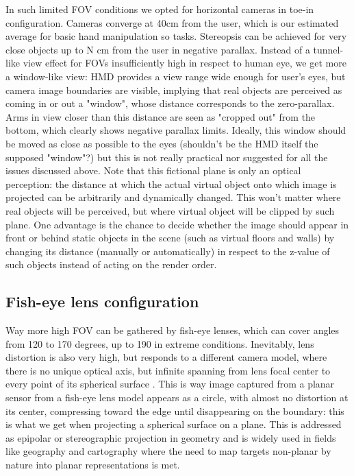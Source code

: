 In such limited FOV conditions we opted for horizontal cameras in toe-in configuration. Cameras converge at 40cm from the user, which is our estimated average for basic hand manipulation so tasks. Stereopsis can be achieved for very close objects up to N cm from the user in negative parallax. Instead of a tunnel-like view effect for FOVs insufficiently high in respect to human eye, we get more a window-like view: HMD provides a view range wide enough for user's eyes, but camera image boundaries are visible, implying that real objects are perceived as coming in or out a "window", whose distance corresponds to the zero-parallax. Arms in view closer than this distance are seen as "cropped out" from the bottom, which clearly shows negative parallax limits. Ideally, this window should be moved as close as possible to the eyes (shouldn't be the HMD itself the supposed "window"?) but this is not really practical nor suggested for all the issues discussed above. Note that this fictional plane is only an optical perception: the distance at which the actual virtual object onto which image is projected can be arbitrarily and dynamically changed. This won't matter where real objects will be perceived, but where virtual object will be clipped by such plane. One advantage is the chance to decide whether the image should appear in front or behind static objects in the scene (such as virtual floors and walls) by changing its distance (manually or automatically) in respect to the z-value of such objects instead of acting on the render order.

\subsection{Fish-eye lens configuration}
Way more high FOV can be gathered by fish-eye lenses, which can cover angles from 120 to 170 degrees, up to 190 in extreme conditions. Inevitably, lens distortion is also very high, but responds to a different camera model, where there is no unique optical axis, but infinite spanning from lens focal center to every point of its spherical surface \cite{fisheye_lens}. This is way image captured from a planar sensor from a fish-eye lens model appears as a circle, with almost no distortion at its center, compressing toward the edge until disappearing on the boundary: this is what we get when projecting a spherical surface on a plane. This is addressed as epipolar or stereographic projection in geometry and is widely used in fields like geography and cartography \cite{book_stereographic_projection} where the need to map targets non-planar by nature into planar representations is met.

